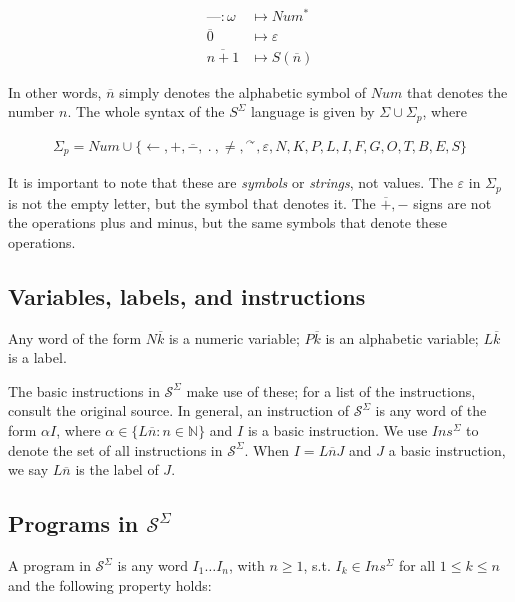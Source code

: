 \documentclass[a4paper, 12pt]{article}
\begin{document}
\begin{align*}
    \text{---} : \omega &\mapsto  Num^{*}  \\ 
    \overline{0} & \mapsto \varepsilon \\ 
    \overline{n + 1} &\mapsto S(\overline{n})
\end{align*}

In other words, $\overline{n}$ simply denotes the alphabetic symbol of $Num$
that denotes the number $n$. The whole syntax of the $S^{\Sigma}$ language is
given by $\Sigma \cup \Sigma_p$, where

\begin{align*}
    \Sigma_p = Num \cup \{ \leftarrow, +, \overline{-}, ~ . ~, \neq, {}^{\curvearrowright},
    \varepsilon, N, K, P, L, I, F, G, O, T, B, E, S \}
\end{align*}

It is important to note that these are \textit{symbols} or \textit{strings}, not
values. The $\varepsilon$ in $\Sigma_p$ is not the empty letter, but the symbol
that denotes it. The $\overline{+}, -$ signs are not the operations plus and
minus, but the same symbols that denote these operations. 

\subsection{Variables, labels, and instructions}

Any word of the form $N \overline{k}$ is a numeric variable; $P \overline{k}$ is
an alphabetic variable; $L \overline{k}$ is a label.

The basic instructions in $\mathcal{S}^{\Sigma}$ make use of these; for a list
of the instructions, consult the original source. In general, an instruction of
$\mathcal{S}^{\Sigma}$ is any word of the form $\alpha I$, where $\alpha \in \{L
\overline{n}: n \in \mathbb{N}\}$ and $I$ is a basic instruction. We use
$Ins^{\Sigma}$ to denote the set of all instructions in $\mathcal{S}^{\Sigma}$.
When $I = L \overline{n} J$ and $J$ a basic instruction, we say $L \overline{n}$
is the label of $J$.

\subsection{Programs in $\mathcal{S}^{\Sigma}$}

A program in $\mathcal{S}^{\Sigma}$ is any word $I_1 \ldots I_n$, with $n \geq
1$, s.t. $I_k \in Ins^{\Sigma}$ for all $1 \leq k \leq n$ and the following
property holds:
\end{document}
